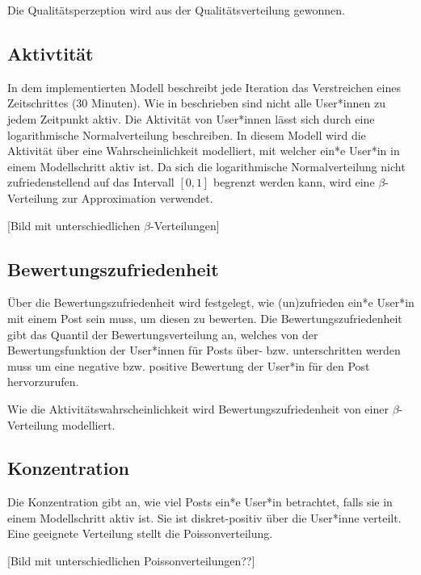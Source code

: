Die Qualitätsperzeption wird aus der Qualitätsverteilung gewonnen.

\subsection{Aktivtität}

In dem implementierten Modell beschreibt jede Iteration das Verstreichen eines Zeitschrittes (30 Minuten). Wie in \cite{Hogg20121} beschrieben sind nicht alle User*innen zu jedem Zeitpunkt aktiv. Die Aktivität von User*innen lässt sich durch eine logarithmische Normalverteilung
beschreiben. In diesem Modell wird die Aktivität über eine Wahrscheinlichkeit modelliert,  mit welcher ein*e User*in in einem Modellschritt aktiv ist. Da sich die logarithmische Normalverteilung nicht zufriedenstellend auf das Intervall $ [0,1]$ begrenzt werden kann, wird eine $\beta$-Verteilung zur Approximation verwendet.

[Bild mit unterschiedlichen $\beta$-Verteilungen]

\subsection{Bewertungszufriedenheit}


Über die Bewertungszufriedenheit wird festgelegt, wie (un)zufrieden ein*e User*in mit einem Post sein muss, um diesen zu bewerten. 
Die Bewertungszufriedenheit gibt das Quantil der Bewertungsverteilung an, welches von der Bewertungsfunktion der User*innen für Posts über- bzw. unterschritten werden muss um eine negative bzw. positive Bewertung der User*in für den Post hervorzurufen.

Wie die Aktivitätswahrscheinlichkeit wird Bewertungszufriedenheit von einer $\beta$-Verteilung modelliert.

\subsection{Konzentration}

Die Konzentration gibt an, wie viel Posts ein*e User*in betrachtet, falls sie in einem Modellschritt aktiv ist.
Sie ist diskret-positiv über die User*inne verteilt. Eine geeignete Verteilung stellt die Poissonverteilung.

[Bild mit unterschiedlichen Poissonverteilungen??]

